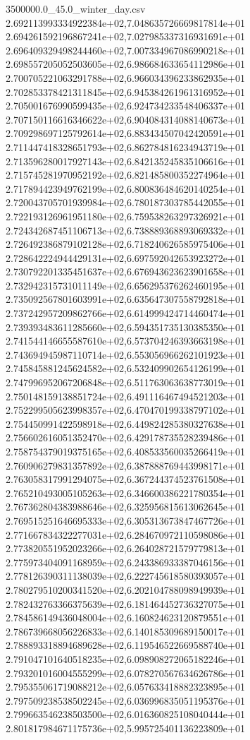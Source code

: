 \begin{filecontents*}{3500000.0_45.0_winter_day.csv}
2.692113993334922384e+02,7.048635726669817814e+01
2.694261592196867241e+02,7.027985337316931691e+01
2.696409329498244460e+02,7.007334967086990218e+01
2.698557205052503605e+02,6.986684633654112986e+01
2.700705221063291788e+02,6.966034396233862935e+01
2.702853378421311845e+02,6.945384261961316952e+01
2.705001676990599435e+02,6.924734233548406337e+01
2.707150116616346622e+02,6.904084314088140673e+01
2.709298697125792614e+02,6.883434507042420591e+01
2.711447418328651793e+02,6.862784816234943719e+01
2.713596280017927143e+02,6.842135245835106616e+01
2.715745281970952192e+02,6.821485800352274964e+01
2.717894423949762199e+02,6.800836484620140254e+01
2.720043705701939984e+02,6.780187303785442055e+01
2.722193126961951180e+02,6.759538263297326921e+01
2.724342687451106713e+02,6.738889368893069332e+01
2.726492386879102128e+02,6.718240626585975406e+01
2.728642224944429131e+02,6.697592042653923272e+01
2.730792201335451637e+02,6.676943623623901658e+01
2.732942315731011149e+02,6.656295376262460195e+01
2.735092567801603991e+02,6.635647307558792818e+01
2.737242957209862766e+02,6.614999424714460474e+01
2.739393483611285660e+02,6.594351735130385350e+01
2.741544146655587610e+02,6.573704246393663198e+01
2.743694945987110714e+02,6.553056966262101923e+01
2.745845881245624582e+02,6.532409902654126199e+01
2.747996952067206848e+02,6.511763063638773019e+01
2.750148159138851724e+02,6.491116467494521203e+01
2.752299505623998357e+02,6.470470199338797102e+01
2.754450991422598918e+02,6.449824285380327638e+01
2.756602616051352470e+02,6.429178735528239486e+01
2.758754379019375165e+02,6.408533560035266419e+01
2.760906279831357892e+02,6.387888769443998171e+01
2.763058317991294075e+02,6.367244374523761508e+01
2.765210493005105263e+02,6.346600386221780354e+01
2.767362804383988646e+02,6.325956815613062645e+01
2.769515251646695333e+02,6.305313673847467726e+01
2.771667834322277031e+02,6.284670972110598086e+01
2.773820551952023266e+02,6.264028721579779813e+01
2.775973404091168959e+02,6.243386933387046156e+01
2.778126390311138039e+02,6.222745618580393057e+01
2.780279510200341520e+02,6.202104788098949939e+01
2.782432763366375639e+02,6.181464452736327075e+01
2.784586149436048004e+02,6.160824623120879551e+01
2.786739668056226833e+02,6.140185309689150017e+01
2.788893318894689628e+02,6.119546522669588740e+01
2.791047101640518235e+02,6.098908272065182246e+01
2.793201016004555299e+02,6.078270567634626786e+01
2.795355061719088212e+02,6.057633418882323895e+01
2.797509238538502245e+02,6.036996835051195376e+01
2.799663546238503500e+02,6.016360825108040444e+01
2.801817984671175736e+02,5.995725401136223809e+01

\end{filecontents*}

